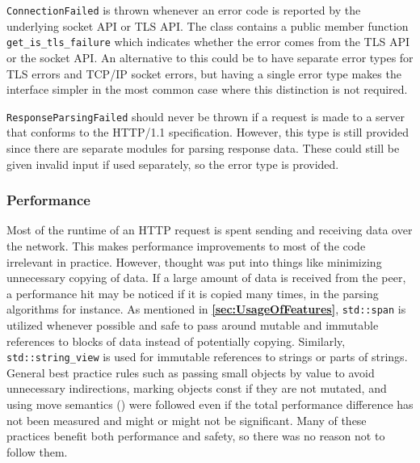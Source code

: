 \documentclass[12pt, a4paper]{article}
\begin{document}
\texttt{ConnectionFailed} is thrown whenever an error code is reported by the underlying socket API or TLS API. The class contains a public member function \texttt{get\_is\_tls\_failure} which indicates whether the error comes from the TLS API or the socket API. An alternative to this could be to have separate error types for TLS errors and TCP/IP socket errors, but having a single error type makes the interface simpler in the most common case where this distinction is not required. 

\texttt{ResponseParsingFailed} should never be thrown if a request is made to a server that conforms to the HTTP/1.1 specification. However, this type is still provided since there are separate modules for parsing response data. These could still be given invalid input if used separately, so the error type is provided.

\subsubsection{Performance}
Most of the runtime of an HTTP request is spent sending and receiving data over the network. This makes performance improvements to most of the code irrelevant in practice. However, thought was put into things like minimizing unnecessary copying of data. If a large amount of data is received from the peer, a performance hit may be noticed if it is copied many times, in the parsing algorithms for instance. As mentioned in \textbf{\ref{sec:UsageOfFeatures}}, \texttt{std::span} is utilized whenever possible and safe to pass around mutable and immutable references to blocks of data instead of potentially copying. Similarly, \texttt{std::string\_view} is used for immutable references to strings or parts of strings. General best practice rules such as passing small objects by value to avoid unnecessary indirections, marking objects const if they are not mutated, and using move semantics (\cite{CppCoreGuidelines}) were followed even if the total performance difference has not been measured and might or might not be significant. Many of these practices benefit both performance and safety, so there was no reason not to follow them.
\end{document}
